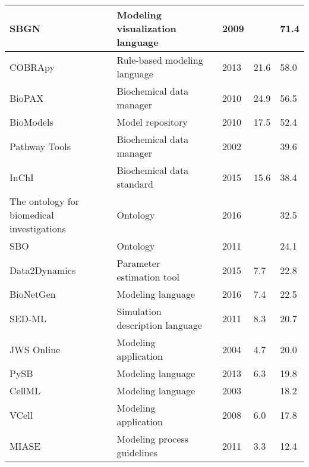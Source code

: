 \begin{longtable}{ |L{2.2cm}|L{5cm}|L{1.2cm}|L{1cm}|R{1.2cm}|R{1cm}| }
\hline
\small{SBGN} &\small{Modeling visualization language} &\cite{Novere2009TheNotation} &\small{2009} &\small{} &\small{71.4}\\
\hline
\small{COBRApy} &\small{Rule-based modeling language} &\cite{ebrahim2013cobrapy} &\small{2013} &\small{21.6} &\small{58.0}\\
\hline
\small{BioPAX} &\small{Biochemical data manager} &\cite{Demir2010TheSharing.} &\small{2010} &\small{24.9} &\small{56.5}\\
\hline
\small{BioModels} &\small{Model repository} &\cite{Li2010BioModelsModelsb} &\small{2010} &\small{17.5} &\small{52.4}\\
\hline
\small{Pathway Tools} &\small{Biochemical data manager} &\cite{karp2002pathway} &\small{2002} &\small{} &\small{39.6}\\
\hline
\small{InChI} &\small{Biochemical data standard} &\cite{Heller2015InChIIdentifier.} &\small{2015} &\small{15.6} &\small{38.4}\\
\hline
\small{The ontology for biomedical investigations} &\small{Ontology} &\cite{Bandrowski2016TheInvestigations} &\small{2016} &\small{} &\small{32.5}\\
\hline
\small{SBO} &\small{Ontology} &\cite{Courtot2011ControlledBiology.} &\small{2011} &\small{} &\small{24.1}\\
\hline
\small{Data2Dynamics} &\small{Parameter estimation tool} &\cite{Raue2015Data2Dynamics:Systems} &\small{2015} &\small{7.7} &\small{22.8}\\
\hline
\small{BioNetGen} &\small{Modeling language} &\cite{Harris2016BioNetGenModeling} &\small{2016} &\small{7.4} &\small{22.5}\\
\hline
\small{SED-ML} &\small{Simulation description language} &\cite{Waltemath2011ReproducibleLanguage} &\small{2011} &\small{8.3} &\small{20.7}\\
\hline
\small{JWS Online} &\small{Modeling application} &\cite{Olivier2004Web-basedOnline} &\small{2004} &\small{4.7} &\small{20.0}\\
\hline
\small{PySB} &\small{Modeling language} &\cite{Lopez2013ProgrammingPySB} &\small{2013} &\small{6.3} &\small{19.8}\\
\hline
\small{CellML} &\small{Modeling language} &\cite{Cuellar2003AnLanguage} &\small{2003} &\small{} &\small{18.2}\\
\hline
\small{VCell} &\small{Modeling application} &\cite{moraru2008virtual} &\small{2008} &\small{6.0} &\small{17.8}\\
\hline
\small{MIASE} &\small{Modeling process guidelines} &\cite{Waltemath2011MinimumMIASE} &\small{2011} &\small{3.3} &\small{12.4}\\

\end{longtable}
